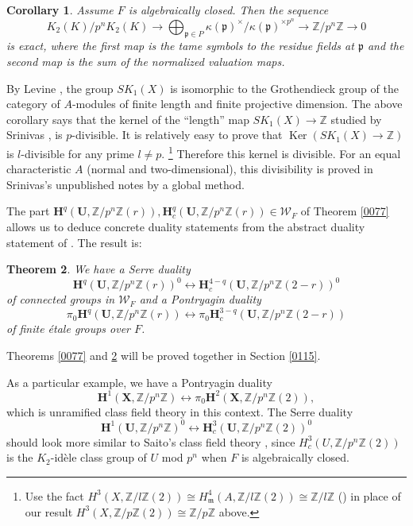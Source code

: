 \documentclass{amsart}
\newtheorem{Thm}{Theorem}[section]
\newtheorem{Cor}[Thm]{Corollary}
\theoremstyle{remark}
\numberwithin{equation}{section}
\newcommand{\Z}{\mathbb{Z}}
\newcommand{\alg}[1]{\mathbf{#1}}
\newcommand{\ideal}[1]{\mathfrak{#1}}
\DeclareMathOperator{\Ker}{Ker}
\begin{document}
\begin{Cor}
	Assume $F$ is algebraically closed.
	Then the sequence
		\[
				K_{2}(K) / p^{n} K_{2}(K)
			\to
				\bigoplus_{\ideal{p} \in P}
					\kappa(\ideal{p})^{\times} / \kappa(\ideal{p})^{\times p^{n}}
			\to
				\Z / p^{n} \Z
			\to
				0
		\]
	is exact,
	where the first map is the tame symbols to the residue fields at $\ideal{p}$
	and the second map is the sum of the normalized valuation maps.
\end{Cor}

By Levine \cite[Theorem 2.1]{Lev88},
the group $SK_{1}(X)$ is isomorphic to
the Grothendieck group of the category of $A$-modules of finite length and finite projective dimension.
The above corollary says that the kernel of the ``length'' map
$SK_{1}(X) \to \Z$ studied by Srinivas \cite{Sri87}, \cite[Chapter 9]{Sri96} is $p$-divisible.
It is relatively easy to prove that $\Ker(SK_{1}(X) \to \Z)$ is $l$-divisible for any prime $l \ne p$.%
\footnote{
	Use the fact $H^{3}(X, \Z / l \Z(2)) \cong H^{4}_{\ideal{m}}(A, \Z / l \Z(2)) \cong \Z / l \Z$
	(\cite[Expos\'e XVII, Corollaire 3.4.1.6]{ILO14})
	in place of our result $H^{3}(X, \Z / p \Z(2)) \cong \Z / p \Z$ above.
}
Therefore this kernel is divisible.
For an equal characteristic $A$ (normal and two-dimensional),
this divisibility is proved
in Srinivas's unpublished notes \cite{Sri85} by a global method.

The part $\alg{H}^{q}(\alg{U}, \Z / p^{n} \Z(r)),
\alg{H}^{q}_{c}(\alg{U}, \Z / p^{n} \Z(r)) \in \mathcal{W}_{F}$
of Theorem \ref{0077} allows us to deduce concrete duality statements
from the abstract duality statement of \cite{Suz24}.
The result is:

\begin{Thm} \label{0088}
	We have a Serre duality
		\[
				\alg{H}^{q}(\alg{U}, \Z / p^{n} \Z(r))^{0}
			\leftrightarrow
				\alg{H}^{4 - q}_{c}(\alg{U}, \Z / p^{n} \Z(2 - r))^{0}
		\]
	of connected groups in $\mathcal{W}_{F}$
	and a Pontryagin duality
		\[
				\pi_{0}
				\alg{H}^{q}(\alg{U}, \Z / p^{n} \Z(r))
			\leftrightarrow
				\pi_{0}
				\alg{H}^{3 - q}_{c}(\alg{U}, \Z / p^{n} \Z(2 - r))
		\]
	of finite \'etale groups over $F$.
\end{Thm}

Theorems \ref{0077} and \ref{0088} will be proved together in Section \ref{0115}.

As a particular example, we have a Pontryagin duality
	\[
			\alg{H}^{1}(\alg{X}, \Z / p^{n} \Z)
		\leftrightarrow
			\pi_{0} \alg{H}^{2}(\alg{X}, \Z / p^{n} \Z(2)),
	\]
which is unramified class field theory in this context.
The Serre duality
	\[
			\alg{H}^{1}(\alg{U}, \Z / p^{n} \Z)^{0}
		\leftrightarrow
			\alg{H}^{3}_{c}(\alg{U}, \Z / p^{n} \Z(2))^{0}
	\]
should look more similar to Saito's class field theory \cite{Sai87},
since $H^{3}_{c}(U, \Z / p^{n} \Z(2))$ is the $K_{2}$-id\`ele class group of $U$ mod $p^{n}$
when $F$ is algebraically closed.
\end{document}

